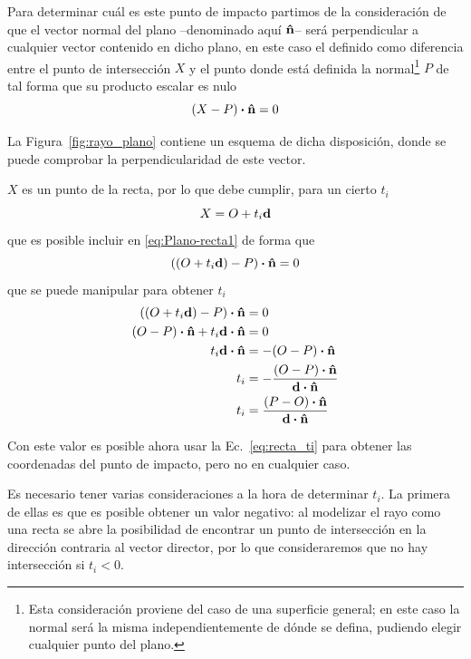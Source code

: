 Para determinar cuál es este punto de impacto partimos de la consideración de que el vector normal del plano --denominado aquí $\vu{n}$-- será perpendicular a cualquier vector contenido en dicho plano, en este caso el definido como diferencia entre el punto de intersección $X$ y el punto donde está definida la normal\footnote{Esta consideración proviene del caso de una superficie general; en este caso la normal será la misma independientemente de dónde se defina, pudiendo elegir cualquier punto del plano.} $P$ de tal forma que su producto escalar es nulo
\begin{equation}\label{eq:Plano-recta1}
    (X-P)\vdot\vu{n} = 0
\end{equation}

La Figura~\ref{fig:rayo_plano} contiene un esquema de dicha disposición, donde se puede comprobar la perpendicularidad de este vector.

$X$ es un punto de la recta, por lo que debe cumplir, para un cierto $t_i$
\begin{equation}\label{eq:recta_ti}
    X = O + t_i\vb{d}
\end{equation}
que es posible incluir en \eqref{eq:Plano-recta1} de forma que
\begin{equation}
    ((O + t_i\vb{d})-P)\vdot\vu{n} = 0
\end{equation}
que se puede manipular para obtener $t_i$
\begin{equation}\label{eq:t_i}
    \begin{aligned}
        ((O + t_i\vb{d})-P)\vdot\vu{n} &= 0 \\
        (O - P)\vdot\vu{n} + t_i\vb{d}\vdot\vu{n}  &= 0 \\
        t_i\vb{d}\vdot\vu{n} &= - (O - P)\vdot\vu{n}\\
        t_i &= -\frac{(O - P)\vdot\vu{n}}{\vb{d}\vdot\vu{n}}\\
        t_i &= \frac{(P-O)\vdot\vu{n}}{\vb{d}\vdot\vu{n}}
    \end{aligned}
\end{equation}

Con este valor es posible ahora usar la Ec.~\eqref{eq:recta_ti} para obtener las coordenadas del punto de impacto, pero no en cualquier caso.

Es necesario tener varias consideraciones a la hora de determinar $t_i$.
La primera de ellas es que es posible obtener un valor negativo: al modelizar el rayo como una recta se abre la posibilidad de encontrar un punto de intersección en la dirección contraria al vector director, por lo que consideraremos que no hay intersección si $t_i < 0$.

